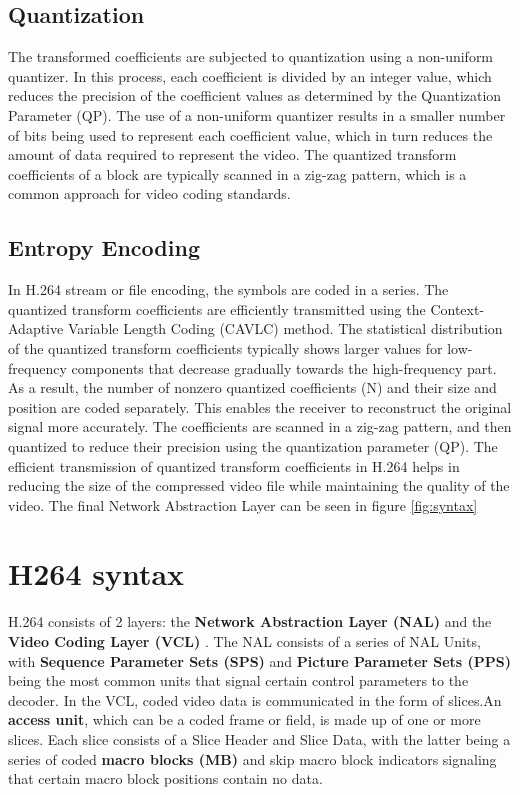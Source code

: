 \subsection{Quantization}
The transformed coefficients are subjected to quantization using a non-uniform quantizer. In this process, each coefficient is divided by an integer value, which reduces the precision of the coefficient values as determined by the Quantization Parameter (QP). The use of a non-uniform quantizer results in a smaller number of bits being used to represent each coefficient value, which in turn reduces the amount of data required to represent the video. The quantized transform coefficients of a block are typically scanned in a zig-zag pattern, which is a common approach for video coding standards.


\subsection{Entropy Encoding}
In H.264 stream or file encoding, the symbols are coded in a series. The quantized transform coefficients are efficiently transmitted using the Context-Adaptive Variable Length Coding (CAVLC) method. The statistical distribution of the quantized transform coefficients typically shows larger values for low-frequency components that decrease gradually towards the high-frequency part. As a result, the number of nonzero quantized coefficients (N) and their size and position are coded separately. This enables the receiver to reconstruct the original signal more accurately. The coefficients are scanned in a zig-zag pattern, and then quantized to reduce their precision using the quantization parameter (QP). The efficient transmission of quantized transform coefficients in H.264 helps in reducing the size of the compressed video file while maintaining the quality of the video. The final Network Abstraction Layer can be seen in figure \ref{fig:syntax}


\section{H264 syntax}
H.264 consists of 2 layers: the \textbf{Network Abstraction Layer (NAL)} and the \textbf{Video Coding Layer (VCL)} \cite{richardson2010h264}. The NAL consists of a series of NAL Units, with \textbf{Sequence Parameter Sets (SPS)} and \textbf{Picture Parameter Sets (PPS)} being the most common units that signal certain control parameters to the decoder. In the VCL, coded video data is communicated in the form of slices.An \textbf{access unit}, which can be a coded frame or field, is made up of one or more slices. Each slice consists of a Slice Header and Slice Data, with the latter being a series of coded \textbf{macro blocks (MB)} and skip macro block indicators signaling that certain macro block positions contain no data.

